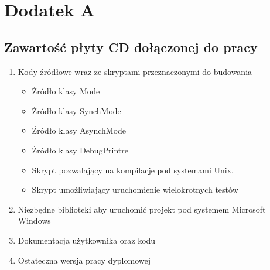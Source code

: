 \documentclass{BscUS}
\begin{document}
\newpage
\pagestyle{empty}
\appendix
\chapter*{Dodatek A} \label{App:AppendixA}
\section*{Zawartość płyty CD dołączonej do pracy}

\begin{enumerate}
\item Kody źródłowe wraz ze skryptami przeznaczonymi do budowania
\begin{itemize}
\item Źródło klasy Mode
\item Źródło klasy SynchMode
\item Źródło klasy AsynchMode
\item Źródło klasy DebugPrintre
\item Skrypt pozwalający na kompilacje pod systemami Unix.
\item Skrypt umożliwiający uruchomienie wielokrotnych testów
\end{itemize}
\item Niezbędne biblioteki aby uruchomić projekt pod systemem Microsoft Windows
\item Dokumentacja użytkownika oraz kodu
\item Ostateczna wersja pracy dyplomowej
\end{enumerate}


\newpage
\end{document}
